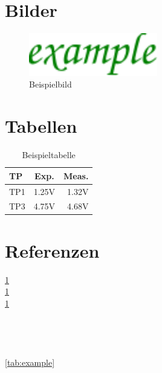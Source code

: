 \documentclass[a4paper, 10pt, fleqn]{article}
\begin{document}
\newpage

\section{Bilder}
\label{sec:fig}
\begin{figure}[h!]
    \centering
    \includegraphics[width=0.5\textwidth] {../fig/example.pdf}
    \caption{Beispielbild}
    \label{fig:example}
\end{figure}

\newpage

\section{Tabellen}
\label{sec:tab}
\begin{table}[h!]
    \centering
    \begin{tabular}{l|c|r}
        TP  & Exp.  & Meas. \\
        \hline
        TP1 & 1.25V & 1.32V \\
        TP3 & 4.75V & 4.68V \\
    \end{tabular}
    \caption{Beispieltabelle}
    \label{tab:example}
\end{table}

\newpage

\section{Referenzen}
\label{sec:ref}

\ref{sec:fig} \\
\ref{fig:example} \\
\ref{tab:example} \\
\pageref{sec:fig} \\
\pageref{fig:example} \\
\pageref{tab:example} \\
 \\
\autoref{tab:example} \\
\end{document}
